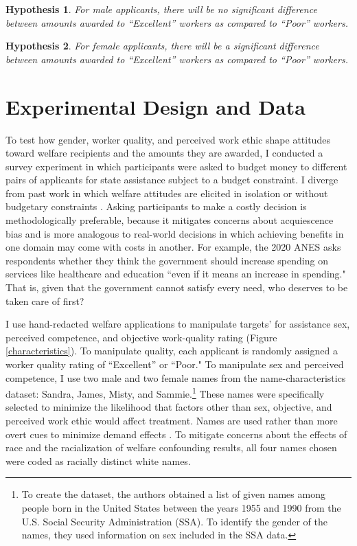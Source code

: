 \documentclass[12pt]{article}%
\newtheorem{hypothesis}{Hypothesis}
\begin{document}
\begin{doublespace}
\begin{hypothesis} \label{hyp:thirda}
	For male applicants, there will be no significant difference between amounts awarded to ``Excellent” workers as compared to ``Poor” workers.
\end{hypothesis}

\begin{hypothesis} \label{hyp:thirdb}
	For female applicants, there will be a significant difference between amounts awarded to ``Excellent” workers as compared to ``Poor” workers.
\end{hypothesis}


\section*{Experimental Design and Data}
To test how gender, worker quality, and perceived work ethic shape attitudes toward welfare recipients and the amounts they are awarded, I conducted a survey experiment in which participants were asked to budget money to different pairs of applicants for state assistance subject to a budget constraint. I diverge from past work in which welfare attitudes are elicited in isolation or without budgetary constraints \citep{rabinowitz2009white, aaroe2014crowding, sniderman1993scar, monnat2010color}. Asking participants to make a costly decision is methodologically preferable, because it mitigates concerns about acquiescence bias and is more analogous to real-world decisions in which achieving benefits in one domain may come with costs in another. For example, the 2020 ANES asks respondents whether they think the government should increase spending on services like healthcare and education ``even if it means an increase in spending." That is, given that the government cannot satisfy every need, who deserves to be taken care of first?

I use hand-redacted welfare applications to manipulate targets’ for assistance sex, perceived competence, and objective work-quality rating (Figure \ref{characteristics}). To manipulate quality, each applicant is randomly assigned a worker quality rating of ``Excellent” or ``Poor." To manipulate sex and perceived competence, I use two male and two female names from the \cite{hayes_2020} name-characteristics dataset: Sandra, James, Misty, and Sammie.\footnote{To create the dataset, the authors obtained a list of given names among people born in the United States between the years 1955 and 1990 from the U.S. Social Security Administration (SSA). To identify the gender of the names, they used information on sex included in the SSA data.} These names were specifically selected to minimize the likelihood that factors other than sex, objective, and perceived work ethic would affect treatment. Names are used rather than more overt cues to minimize demand effects \citep{quidt_experimenter_2019, mummolo2019demand}. To mitigate concerns about the effects of race and the racialization of welfare confounding results, all four names chosen were coded as racially distinct white names.


\end{doublespace}
\end{document}
